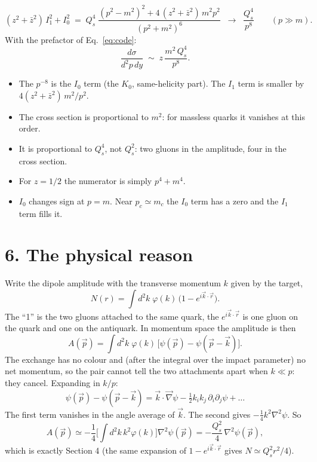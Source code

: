 \documentclass[12pt]{article}
\begin{document}
\begin{equation}
  (z^2+\bar z^2)\,I_1^2 + I_0^2 \;=\; Q_s^4\;\frac{(p^2-m^2)^2 + 4\,(z^2+\bar z^2)\,m^2p^2}{(p^2+m^2)^6}
  \;\;\longrightarrow\;\; \frac{Q_s^4}{p^8}\qquad (p\gg m).
  \label{eq:g}
\end{equation}
With the prefactor of Eq.~\eqref{eq:code}:
\begin{equation}
  \frac{d\sigma}{d^2p\,dy}\;\sim\; z\,\frac{m^2\,Q_s^4}{p^8}.
\end{equation}
\begin{itemize}
\item The $p^{-8}$ is the $I_0$ term (the $K_0$, same-helicity part). The $I_1$ term is smaller by
$4(z^2+\bar z^2)\,m^2/p^2$.
\item The cross section is proportional to $m^2$: for massless quarks it vanishes at this order.
\item It is proportional to $Q_s^4$, not $Q_s^2$: two gluons in the amplitude, four in the cross section.
\item For $z=1/2$ the numerator is simply $p^4+m^4$.
\item $I_0$ changes sign at $p=m$. Near $p_c\simeq m_c$ the $I_0$ term has a zero and the $I_1$ term
fills it.
\end{itemize}

\section*{6. The physical reason}

Write the dipole amplitude with the transverse momentum $k$ given by the target,
\begin{equation}
  N(r) = \int d^2k\;\varphi(k)\,\big(1-e^{i\vec k\cdot\vec r}\big).
\end{equation}
The ``1'' is the two gluons attached to the same quark, the $e^{i\vec k\cdot\vec r}$ is one gluon on
the quark and one on the antiquark. In momentum space the amplitude is then
\begin{equation}
  A(\vec p) = \int d^2k\;\varphi(k)\,\big[\psi(\vec p)-\psi(\vec p-\vec k)\big].
  \label{eq:diff}
\end{equation}
The exchange has no colour and (after the integral over the impact parameter) no net momentum, so
the pair cannot tell the two attachments apart when $k\ll p$: they cancel. Expanding in $k/p$:
\[
  \psi(\vec p)-\psi(\vec p-\vec k) = \vec k\cdot\vec\nabla\psi - \tfrac12 k_ik_j\,\partial_i\partial_j\psi+\dots
\]
The first term vanishes in the angle average of $\vec k$. The second gives $-\tfrac14k^2\nabla^2\psi$. So
\begin{equation}
  A(\vec p)\simeq -\frac14\Big[\int d^2k\,k^2\varphi(k)\Big]\nabla^2\psi(\vec p) = -\frac{Q_s^2}{4}\,\nabla^2\psi(\vec p),
\end{equation}
which is exactly Section 4 (the same expansion of $1-e^{i\vec k\cdot\vec r}$ gives $N\simeq Q_s^2r^2/4$).
\end{document}
